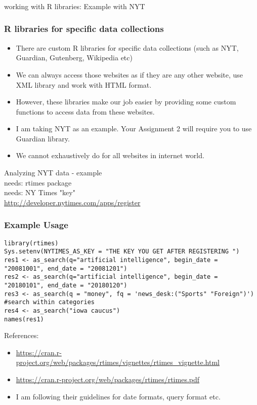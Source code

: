 \documentclass{beamer}
\begin{document}
\begin{frame}
\frametitle{}
\Large working with R libraries: Example with NYT
\end{frame}

\begin{frame}
\frametitle{R libraries for specific data collections}
\begin{itemize}
\item There are custom R libraries for specific data collections (such as NYT, Guardian, Gutenberg, Wikipedia etc) \pause
\item We can always access those websites as if they are any other website, use XML library and work with HTML format.
\item However, these libraries make our job easier by providing some custom functions to access data from these websites. \pause
\item I am taking NYT as an example. Your Assignment 2 will require you to use Guardian library. 
\item We cannot exhaustively do for all websites in internet world. 
\end{itemize}
\end{frame}

\begin{frame}
\Large Analyzing NYT data - example
\normalsize
\\ needs: rtimes package
\\ needs: NY Times "key" \\ \small \url{http://developer.nytimes.com/apps/register}
\end{frame}

\begin{frame}[fragile]
\frametitle{Example Usage}
\tiny
\begin{verbatim}
library(rtimes)
Sys.setenv(NYTIMES_AS_KEY = "THE KEY YOU GET AFTER REGISTERING ") 
res1 <- as_search(q="artificial intelligence", begin_date = "20081001", end_date = "20081201")
res2 <- as_search(q="artificial intelligence", begin_date = "20180101", end_date = "20180120")
res3 <- as_search(q = "money", fq = 'news_desk:("Sports" "Foreign")') #search within categories
res4 <- as_search("iowa caucus")
names(res1)
\end{verbatim}
\normalsize
References:
\begin{itemize}
\item \url{https://cran.r-project.org/web/packages/rtimes/vignettes/rtimes_vignette.html}
\item \url{https://cran.r-project.org/web/packages/rtimes/rtimes.pdf}
\item I am following their guidelines for date formats, query format etc.
\end{itemize}
\end{frame}
\end{document}
